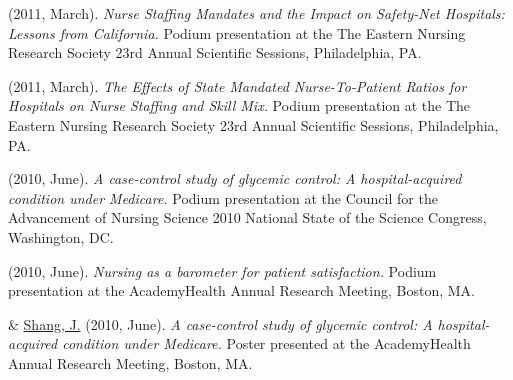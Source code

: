 \documentclass[10pt,]{article}
\begin{document}
{{{{{{{{{{{{{{{\begin{hangparas}{.25in}{1}
\end{hangparas}



\begin{hangparas}{.25in}{1}

 (2011, March). {\textit {Nurse Staffing Mandates and the Impact on Safety-Net Hospitals: Lessons from California.}} Podium presentation at the The Eastern Nursing Research Society 23rd Annual Scientific Sessions, Philadelphia, PA.

\end{hangparas}



\begin{hangparas}{.25in}{1}

 (2011, March). {\textit {The Effects of State Mandated Nurse-To-Patient Ratios for Hospitals on Nurse Staffing and Skill Mix.}} Podium presentation at the The Eastern Nursing Research Society 23rd Annual Scientific Sessions, Philadelphia, PA.

\end{hangparas}



\begin{hangparas}{.25in}{1}

 (2010, June). {\textit {A case-control study of glycemic control: A hospital-acquired condition under Medicare.}} Podium presentation at the Council for the Advancement of Nursing Science 2010 National State of the Science Congress, Washington, DC.

\end{hangparas}



\begin{hangparas}{.25in}{1}

 (2010, June). {\textit {Nursing as a barometer for patient satisfaction.}} Podium presentation at the AcademyHealth Annual Research Meeting, Boston, MA.

\end{hangparas}



\begin{hangparas}{.25in}{1}

 \& {\underline {Shang, J.}} (2010, June). {\textit {A case-control study of glycemic control: A hospital-acquired condition under Medicare.}} Poster presented at the AcademyHealth Annual Research Meeting, Boston, MA.


\end{hangparas}}}}}}}}}}}}}}}}
\end{document}
